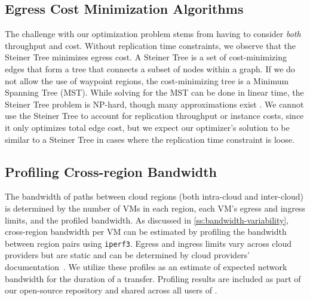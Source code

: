 \subsection{Egress Cost Minimization Algorithms}
The challenge with our optimization problem stems from having to consider \textit{both} throughput and cost. Without replication time constraints, we observe that the Steiner Tree \cite{hwang1992steiner} minimizes egress cost. 
A Steiner Tree is a set of cost-minimizing edges that form a tree that connects a subset of nodes within a graph. 
If we do not allow the use of waypoint regions, the cost-minimizing tree is a Minimum Spanning Tree (MST).  
 While solving for the MST can be done in linear time, the Steiner Tree problem is NP-hard, though many approximations exist \cite{DBLP:conf/ipco/RehfeldtK21}. 
We cannot use the Steiner Tree to account for replication throughput or instance costs, since it only optimizes total edge cost, but we expect our optimizer's solution to be similar to a Steiner Tree in cases where the replication time constraint is loose. 
%

\subsection{Profiling Cross-region Bandwidth}
\label{ss:profiling}
The bandwidth of paths between cloud regions (both intra-cloud and inter-cloud) is determined by the number of VMs in each region, each VM's egress and ingress limits, and the profiled bandwidth. 
As discussed in \cref{ss:bandwidth-variability}, cross-region bandwidth per VM can be estimated by profiling the bandwidth between region pairs using \texttt{iperf3}.
%
Egress and ingress limits vary across cloud providers but are static and can be determined by cloud providers' documentation~\cite{aws_egress_pricing,azure_egress_pricing,gcp_egress_pricing}.
%
We utilize these profiles as an estimate of expected network bandwidth for the duration of a transfer. Profiling results are included as part of our open-source repository and shared across all users of \sys{}. 

